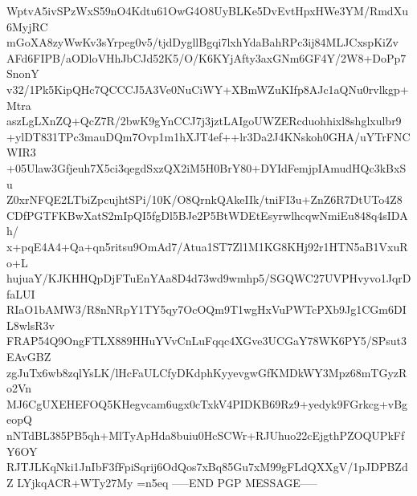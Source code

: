 WptvA5ivSPzWxS59nO4Kdtu61OwG4O8UyBLKe5DvEvtHpxHWe3YM/RmdXu6MyjRC
mGoXA8zyWwKv3sYrpeg0v5/tjdDygllBgqi7lxhYdaBahRPc3ij84MLJCxspKiZv
AFd6FIPB/aODloVHhJbCJd52K5/O/K6KYjAfty3axGNm6GF4Y/2W8+DoPp7SnonY
v32/1Pk5KipQHc7QCCCJ5A3Ve0NuCiWY+XBmWZuKIfp8AJc1aQNu0rvlkgp+Mtra
aszLgLXnZQ+QcZ7R/2bwK9gYnCCJ7j3jztLAIgoUWZERcduohhixl8shglxulbr9
+ylDT831TPc3mauDQm7Ovp1m1hXJT4ef++lr3Da2J4KNskoh0GHA/uYTrFNCWIR3
+05Ulaw3Gfjeuh7X5ci3qegdSxzQX2iM5H0BrY80+DYIdFemjpIAmudHQc3kBxSu
Z0xrNFQE2LTbiZpcujhtSPi/10K/O8QrnkQAkeIIk/tniFI3u+ZnZ6R7DtUTo4Z8
CDfPGTFKBwXatS2mIpQI5fgDl5BJe2P5BtWDEtEsyrwlhcqwNmiEu848q4sIDAh/
x+pqE4A4+Qa+qn5ritsu9OmAd7/Atua1ST7Zl1M1KG8KHj92r1HTN5aB1VxuRo+L
hujuaY/KJKHHQpDjFTuEnYAa8D4d73wd9wmhp5/SGQWC27UVPHvyvo1JqrDfaLUI
RIaO1bAMW3/R8nNRpY1TY5qy7OcOQm9T1wgHxVuPWTcPXb9Jg1CGm6DIL8wlsR3v
FRAP54Q9OngFTLX889HHuYVvCnLuFqqc4XGve3UCGaY78WK6PY5/SPsut3EAvGBZ
zgJuTx6wb8zqlYsLK/lHcFaULCfyDKdphKyyevgwGfKMDkWY3Mpz68mTGyzRo2Vn
MJ6CgUXEHEFOQ5KHegvcam6ugx0cTxkV4PIDKB69Rz9+yedyk9FGrkcg+vBgeopQ
nNTdBL385PB5qh+MlTyApHda8buiu0HcSCWr+RJUhuo22cEjgthPZOQUPkFfY6OY
RJTJLKqNki1JnIbF3fFpiSqrij6OdQos7xBq85Gu7xM99gFLdQXXgV/1pJDPBZdZ
LYjkqACR+WTy27My
=n5eq
-----END PGP MESSAGE-----
